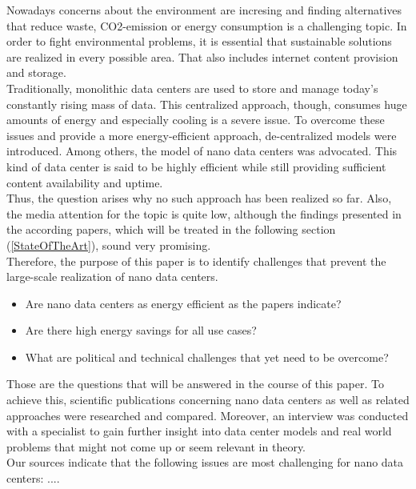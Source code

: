 Nowadays concerns about the environment are incresing and finding alternatives that reduce waste, CO2-emission or energy consumption is a challenging topic. In order to fight environmental problems, it is essential that sustainable solutions are realized in every possible area. That also includes internet content provision and storage.\\ Traditionally, monolithic data centers are used to store and manage today's constantly rising mass of data. This centralized approach, though, consumes huge amounts of energy and especially cooling is a severe issue. To overcome these issues and provide a more energy-efficient approach, de-centralized models were introduced. Among others, the model of nano data centers was advocated. This kind of data center is said to be highly efficient while still providing sufficient content availability and uptime.\\ 
Thus, the question arises why no such approach has been realized so far. Also, the media attention for the topic is quite low, although the findings presented in the according papers, which will be treated in the following section (\autoref{StateOfTheArt}), sound very promising. \\
Therefore, the purpose of this paper is to identify challenges that prevent the large-scale realization of nano data centers. 
\begin{itemize}
\item Are nano data centers as energy efficient as the papers indicate? 
\item Are there high energy savings for all use cases? 
\item What are political and technical challenges that yet need to be overcome? 
\end{itemize}
Those are the questions that will be answered in the course of this paper. To achieve this, scientific publications concerning nano data centers as well as related approaches were researched and compared. Moreover, an interview was conducted with a specialist to gain further insight into data center models and real world problems that might not come up or seem relevant in theory.\\
Our sources indicate that the following issues are most challenging for nano data centers: ....